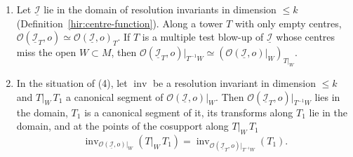 \begin{lemma}
\begin{enumerate}
\item Let \(\underline{\mathcal I}\) lie in the domain of resolution invariants in dimension \(\le k\) (Definition~\ref{hir:centre-function}). Along a tower \(T\) with only empty
centres, \(\mathcal O(\underline{\mathcal I}_T,o)\simeq\mathcal O(\underline{\mathcal I},o)_T\). If \(T\) is a multiple test blow-up of \(\underline{\mathcal I}\) whose centres miss the open
\(W\subset M\), then \(\mathcal O(\underline{\mathcal I}_T,o)|_{T^{-1}W}\simeq(\mathcal O(\underline{\mathcal I},o)|_W)_{T|_W}\).
\item In the situation of (4), let \(\operatorname{inv}\) be a resolution invariant in dimension \(\le k\) and \(T|_W\,T_1\) a canonical segment of \(\mathcal O(\underline{\mathcal I},o)|_W\). Then
\(\mathcal O(\underline{\mathcal I}_T,o)|_{T^{-1}W}\) lies in the domain, \(T_1\) is a canonical segment of it, its transforms along \(T_1\) lie in the domain, and at the points of the
cosupport along \(T|_W\,T_1\)
\[\operatorname{inv}_{\mathcal O(\underline{\mathcal I},o)|_W}(T|_W\,T_1)=\operatorname{inv}_{\mathcal O(\underline{\mathcal I}_T,o)|_{T^{-1}W}}(T_1).\]
\end{enumerate}
\end{lemma}
